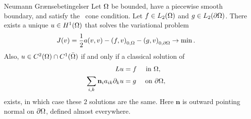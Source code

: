 \begin{frame}{Neumann Grænsebetingelser}{}
    Let $\Omega$  be bounded, have a piecewise smooth boundary, and satisfy the~\label{thm:neumann_solution_existence}
    cone condition. Let $f \in L_2( \Omega)$ and $g\in L_2(\partial \Omega)$.
    There exists a unique $u \in H^1(\Omega)$ that solves the variational problem 
    \begin{equation*}
     J(v) = \frac{1}{2}a(v,v) - {(f,v)}_{0,\Omega} - {(g,v)}_{0,\partial\Omega} \to \min.
    \end{equation*}
    Also, $u \in C^2(\Omega)\cap C^1(\bar{\Omega})$ if and only if a classical solution 
    of 
    \begin{align}
     Lu &= f \quad \text{ in }\Omega, \nonumber \\
     \sum_{i,k}  \mathbf{n}_i a_{ik} \partial_k u &= g \quad \text{ on } \partial \Omega, \label{eq:neuman_condition_boundary}
    \end{align}
    exists, in which case these $2$ solutions are the same. Here $\mathbf{n}$ is outward 
    pointing normal on $\partial \Omega$, defined almost everywhere.
\end{frame}